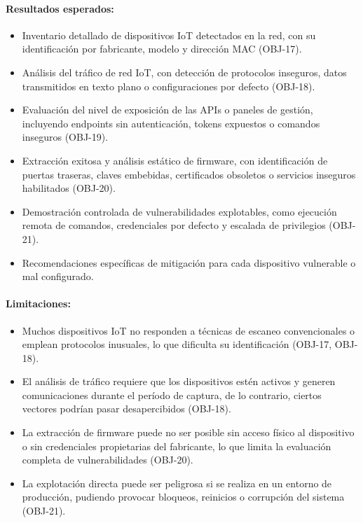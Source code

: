 \documentclass[a4paper, 10pt]{article}
\begin{document}
\paragraph{Resultados esperados:}
\begin{itemize}
    \item Inventario detallado de dispositivos IoT detectados en la red, con su identificación por fabricante, modelo y dirección MAC (OBJ-17).
    \item Análisis del tráfico de red IoT, con detección de protocolos inseguros, datos transmitidos en texto plano o configuraciones por defecto (OBJ-18).
    \item Evaluación del nivel de exposición de las APIs o paneles de gestión, incluyendo endpoints sin autenticación, tokens expuestos o comandos inseguros (OBJ-19).
    \item Extracción exitosa y análisis estático de firmware, con identificación de puertas traseras, claves embebidas, certificados obsoletos o servicios inseguros habilitados (OBJ-20).
    \item Demostración controlada de vulnerabilidades explotables, como ejecución remota de comandos, credenciales por defecto y escalada de privilegios (OBJ-21).
    \item Recomendaciones específicas de mitigación para cada dispositivo vulnerable o mal configurado.
\end{itemize}

\paragraph{Limitaciones:}
\begin{itemize}
    \item Muchos dispositivos IoT no responden a técnicas de escaneo convencionales o emplean protocolos inusuales, lo que dificulta su identificación (OBJ-17, OBJ-18).
    \item El análisis de tráfico requiere que los dispositivos estén activos y generen comunicaciones durante el período de captura, de lo contrario, ciertos vectores podrían pasar desapercibidos (OBJ-18).
    \item La extracción de firmware puede no ser posible sin acceso físico al dispositivo o sin credenciales propietarias del fabricante, lo que limita la evaluación completa de vulnerabilidades (OBJ-20).
    \item La explotación directa puede ser peligrosa si se realiza en un entorno de producción, pudiendo provocar bloqueos, reinicios o corrupción del sistema (OBJ-21).
\end{itemize}
\end{document}
